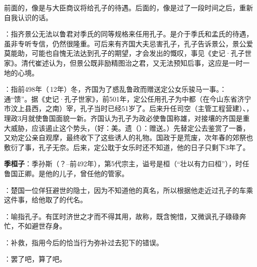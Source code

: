 {
\item 前面的，像是与大臣商议将给孔子的待遇。后面的，像是过了一段时间之后，重新自我认识的话。
\item {}：指齐景公无法以鲁君对季氏的同等规格来任用孔子。是介于季氏和孟氏的待遇，虽非专听专信，仍然很隆重。可后来有齐国大夫忌害孔子，孔子告诉景公，景公爱莫能助，可能也自愧无法达到孔子的期望，才会发出的慨叹，事见《史记·孔子世家》。清代崔述认为，但景公既非励精图治之君，又无法预知后事，这应是一时一地的心境。%
}
{}


{
\item {}：指前498年（\,12年）冬，齐国为了惑乱鲁政而赠送定公女乐骏马一事。：通“馈”。据《史记·孔子世家》，前501年，定公任用孔子为中都（在今山东省济宁市汶上县西，之南）宰，孔子当时已经51岁了。后来升任司空（主管工程营建）、，理政3月就使鲁国面貌一新。齐国认为孔子为政必使鲁国称雄，对接壤的齐国是重大威胁，应该遏止这个势头，（好：美。遗（）：赠送。）先替定公去鉴赏了一番，又劝定公亲自观摩，最终收下了这些诱人的礼物。国政于是荒废，次年春的郊祭也敷衍了事，孔子无奈。后来，定公耽于女乐时还不知道，他的日子只剩下3年了。%

\item {}\textbf{季桓子}：季孙斯（？--前492年），第5代宗主，谥号是桓（“壮以有力曰桓”），时任鲁国正卿。是他的儿子，曾任他的管家。
}
{}


{
\item {}：楚国一位佯狂避世的隐士，因为不知道他的真名，所以根据他走近过孔子的车乘这件事，给他取了的代名。
\item {}：喻指孔子。有匡时济世之才而不得其用，故称，既含惋惜，又微讽孔子碌碌奔忙，不如避世存身。%
\item {}：补救，指用今后的恰当行为弥补过去犯下的错误。
\item {}：罢了吧，算了吧。
}
{}


